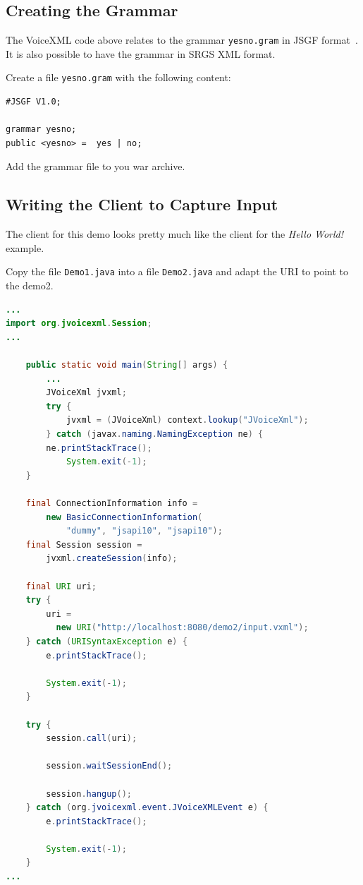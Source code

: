 \documentclass[11pt,a4paper]{article}
\begin{document}
\subsection{Creating the Grammar}
\label{sec:creating-grammar}

The VoiceXML code above relates to the grammar \texttt{yesno.gram} in JSGF
format~\cite{w3c:2000:jsgf}.
It is also possible to have the grammar in SRGS XML format.

Create a file \texttt{yesno.gram} with the following content:

\begin{lstlisting}
#JSGF V1.0;

grammar yesno;
public <yesno> =  yes | no;
\end{lstlisting}

Add the grammar file to you war archive.

\subsection{Writing the Client to Capture Input}

The client for this demo looks pretty much like the client for the \emph{Hello
World!} example.

Copy the file \texttt{Demo1.java} into a file \texttt{Demo2.java} and adapt the
URI to point to the demo2.

\begin{lstlisting}[language=Java]
...
import org.jvoicexml.Session;
...

    public static void main(String[] args) {
        ...
        JVoiceXml jvxml;
        try {
            jvxml = (JVoiceXml) context.lookup("JVoiceXml");
        } catch (javax.naming.NamingException ne) {
	    ne.printStackTrace();
            System.exit(-1);
    }

    final ConnectionInformation info =
        new BasicConnectionInformation(
            "dummy", "jsapi10", "jsapi10");
    final Session session = 
        jvxml.createSession(info);

    final URI uri;
    try {
        uri = 
          new URI("http://localhost:8080/demo2/input.vxml");
    } catch (URISyntaxException e) {
        e.printStackTrace();

        System.exit(-1);
    }

    try {
        session.call(uri);

        session.waitSessionEnd();

        session.hangup();
    } catch (org.jvoicexml.event.JVoiceXMLEvent e) {
        e.printStackTrace();

        System.exit(-1);
    }
...
\end{lstlisting}
\end{document}
